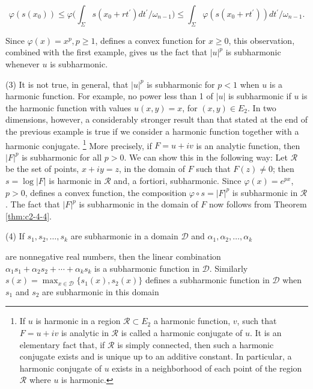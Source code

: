 \[
\varphi(s(x_{0}))\leq\varphi\biggl(\int_{\Sigma}s(x_{0}+r t^{\prime})d t^{\prime}/\omega_{n-1}\biggr)\leq\int_{\Sigma}\varphi(s(x_{0}+r t^{\prime}))d t^{\prime}/\omega_{n-1}.
\]

Since $\varphi(x) = x^p, p \geq 1$, defines a convex function for $x \geq 0$, this observation, combined with the first example, gives us the fact that $|u|^p$ is subharmonic whenever $u$ is subharmonic.

(3) It is not true, in general, that $|u|^p$ is subharmonic for $p < 1$ when $u$ is a harmonic function. For example, no power less than 1 of $|u|$ is subharmonic if $u$ is the harmonic function with values $u(x, y) = x$, for $(x, y) \in E_2$. In two dimensions, however, a considerably stronger result than that stated at the end of the previous example is true if we consider a harmonic function together with a harmonic conjugate. \footnote{If $u$ is harmonic in a region $\mathcal{R} \subset E_2$ a harmonic function, $v$, such that $F = u + iv$ is analytic in $\mathcal{R}$ is called a harmonic conjugate of $u$. It is an elementary fact that, if $\mathcal{R}$ is simply connected, then such a harmonic conjugate exists and is unique up to an additive constant. In particular, a harmonic conjugate of $u$ exists in a neighborhood of each point of the region $\mathcal{R}$ where $u$ is harmonic.} More precisely, if $F = u + iv$ is an analytic function, then $|F|^p$ is subharmonic for all $p > 0$. We can show this in the following way: Let $\mathcal{R}$ be the set of points, $x + iy = z$, in the domain of $F$ such that $F(z) \neq 0$; then $s = \log |F|$ is harmonic in $\mathcal{R}$ and, a fortiori, subharmonic. Since $\varphi(x) = e^{px}$, $p > 0$, defines a convex function, the composition $\varphi \circ s = |F|^p$ is subharmonic in $\mathcal{R}$. The fact that $|F|^p$ is subharmonic in the domain of $F$ now follows from Theorem \ref{thm:c2-4-4}.

(4) If $s_1, s_2, \ldots, s_k$ are subharmonic in a domain $\mathcal{D}$ and $\alpha_1, \alpha_2, \ldots, \alpha_k$

are nonnegative real numbers, then the linear combination $\alpha_1 s_1 + \alpha_2 s_2 + \cdots + \alpha_k s_k$ is a subharmonic function in $\mathcal{D}$. Similarly $s(x) = \max_{x \in \mathcal{D}} \{s_1(x), s_2(x)\}$ defines a subharmonic function in $\mathcal{D}$ when $s_1$ and $s_2$ are subharmonic in this domain

